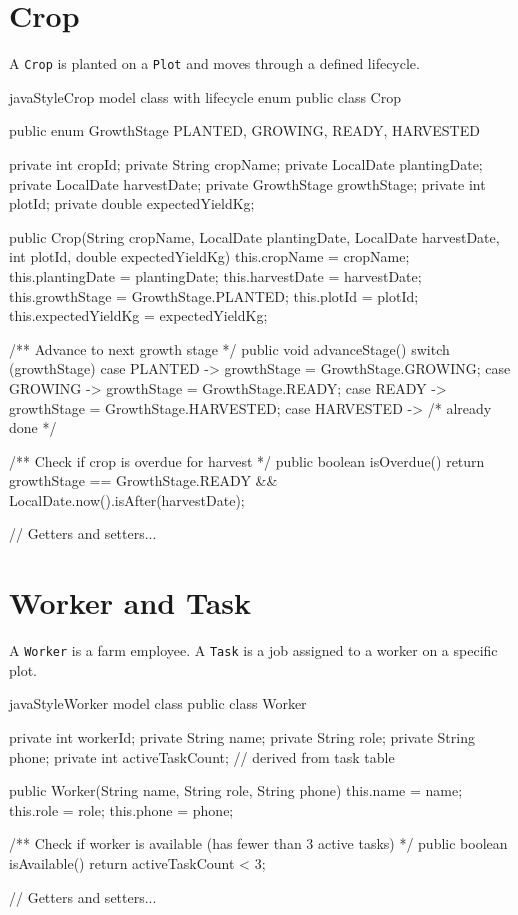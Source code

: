 \documentclass[12pt, a4paper]{report}
\begin{document}
\section{Crop}

A \texttt{Crop} is planted on a \texttt{Plot} and moves through a defined lifecycle.

\begin{codeblock}{javaStyle}{Crop model class with lifecycle enum}
public class Crop {
    public enum GrowthStage { PLANTED, GROWING, READY, HARVESTED }

    private int         cropId;
    private String      cropName;
    private LocalDate   plantingDate;
    private LocalDate   harvestDate;
    private GrowthStage growthStage;
    private int         plotId;
    private double      expectedYieldKg;

    public Crop(String cropName, LocalDate plantingDate, LocalDate harvestDate,
                int plotId, double expectedYieldKg) {
        this.cropName        = cropName;
        this.plantingDate    = plantingDate;
        this.harvestDate     = harvestDate;
        this.growthStage     = GrowthStage.PLANTED;
        this.plotId          = plotId;
        this.expectedYieldKg = expectedYieldKg;
    }

    /** Advance to next growth stage */
    public void advanceStage() {
        switch (growthStage) {
            case PLANTED  -> growthStage = GrowthStage.GROWING;
            case GROWING  -> growthStage = GrowthStage.READY;
            case READY    -> growthStage = GrowthStage.HARVESTED;
            case HARVESTED -> { /* already done */ }
        }
    }

    /** Check if crop is overdue for harvest */
    public boolean isOverdue() {
        return growthStage == GrowthStage.READY
            && LocalDate.now().isAfter(harvestDate);
    }

    // Getters and setters...
}
\end{codeblock}

\section{Worker and Task}

A \texttt{Worker} is a farm employee. A \texttt{Task} is a job assigned to a worker on a specific plot.

\begin{codeblock}{javaStyle}{Worker model class}
public class Worker {
    private int    workerId;
    private String name;
    private String role;
    private String phone;
    private int    activeTaskCount; // derived from task table

    public Worker(String name, String role, String phone) {
        this.name  = name;
        this.role  = role;
        this.phone = phone;
    }

    /** Check if worker is available (has fewer than 3 active tasks) */
    public boolean isAvailable() {
        return activeTaskCount < 3;
    }

    // Getters and setters...
}
\end{codeblock}
\end{document}
